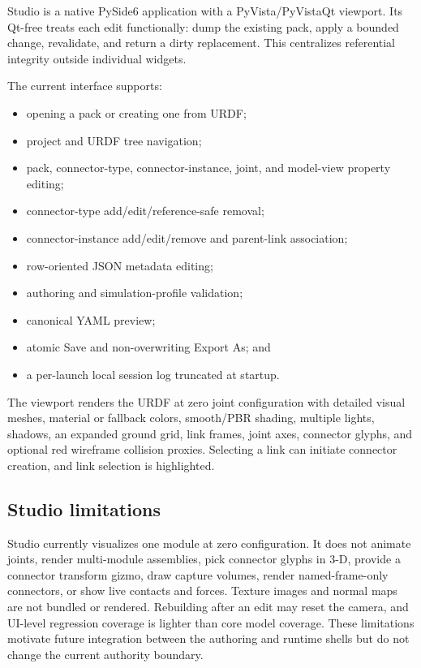 Studio is a native PySide6 application with a PyVista/PyVistaQt viewport. Its Qt-free
 treats each edit functionally: dump the existing pack, apply a
bounded change, revalidate, and return a dirty replacement. This centralizes
referential integrity outside individual widgets.

The current interface supports:

\begin{itemize}
  \item opening a pack or creating one from URDF;
  \item project and URDF tree navigation;
  \item pack, connector-type, connector-instance, joint, and model-view property
        editing;
  \item connector-type add/edit/reference-safe removal;
  \item connector-instance add/edit/remove and parent-link association;
  \item row-oriented JSON metadata editing;
  \item authoring and simulation-profile validation;
  \item canonical YAML preview;
  \item atomic Save and non-overwriting Export As; and
  \item a per-launch local session log truncated at startup.
\end{itemize}

The viewport renders the URDF at zero joint configuration with detailed visual meshes,
material or fallback colors, smooth/PBR shading, multiple lights, shadows, an expanded
ground grid, link frames, joint axes, connector glyphs, and optional red wireframe
collision proxies. Selecting a link can initiate connector creation, and link selection
is highlighted.

\subsection{Studio limitations}

Studio currently visualizes one module at zero configuration. It does not animate
joints, render multi-module assemblies, pick connector glyphs in 3-D, provide a
connector transform gizmo, draw capture volumes, render named-frame-only connectors,
or show live contacts and forces. Texture images and normal maps are not bundled or
rendered. Rebuilding after an edit may reset the camera, and UI-level regression
coverage is lighter than core model coverage. These limitations motivate future
integration between the authoring and runtime shells but do not change the current
authority boundary.

